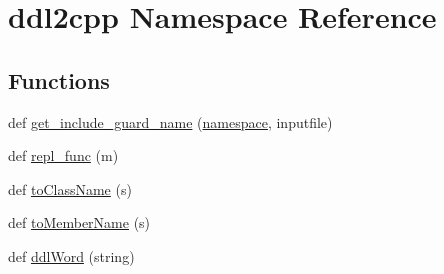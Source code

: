 \hypertarget{namespaceddl2cpp}{}\section{ddl2cpp Namespace Reference}
\label{namespaceddl2cpp}
\subsection*{Functions}
\begin{DoxyCompactItemize}
\item 
def \hyperlink{namespaceddl2cpp_aad55b7fd8f0b28a11c7292ff79a7afde}{get\+\_\+include\+\_\+guard\+\_\+name} (\hyperlink{namespaceddl2cpp_ab0de067ca1d9cc93a2d1e548bb283bb8}{namespace}, inputfile)
\item 
def \hyperlink{namespaceddl2cpp_a2c04bb14c0451cf5e6abb4d0bf0e6a52}{repl\+\_\+func} (m)
\item 
def \hyperlink{namespaceddl2cpp_a171a1c72b1455718e3fcfb822535f3ed}{to\+Class\+Name} (s)
\item 
def \hyperlink{namespaceddl2cpp_a72093c250c34f27e4fc18e8374c7b1d8}{to\+Member\+Name} (s)
\item 
def \hyperlink{namespaceddl2cpp_aef0136dc79fef19dc9bcece9a6fd2396}{ddl\+Word} (string)
\end{DoxyCompactItemize}
